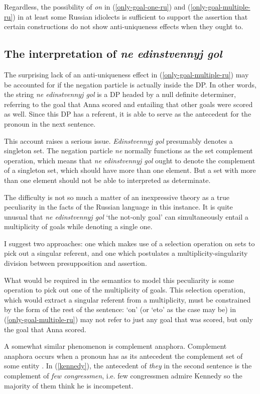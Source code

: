 \documentclass{article}
\begin{document}
Regardless, the possibility of \textit{on} in (\ref{only-goal-one-ru}) and (\ref{only-goal-multiple-ru}) in at least some Russian idiolects is sufficient to support the assertion that certain constructions do not show anti-uniqueness effects when they ought to.

\subsection{The interpretation of \textit{ne edinstvennyj gol}}
The surprising lack of an anti-uniqueness effect in (\ref{only-goal-multiple-ru}) may be accounted for if the negation particle is actually inside the DP. In other words, the string \textit{ne edinstvennyj gol} is a DP headed by a null definite determiner, referring to the goal that Anna scored and entailing that other goals were scored as well. Since this DP has a referent, it is able to serve as the antecedent for the pronoun in the next sentence.

This account raises a serious issue. \textit{Edinstvennyj gol} presumably denotes a singleton set. The negation particle \textit{ne} normally functions as the set complement operation, which means that \textit{ne edinstvennyj gol} ought to denote the complement of a singleton set, which should have more than one element. But a set with more than one element should not be able to interpreted as determinate.

The difficulty is not so much a matter of an inexpressive theory as a true peculiarity in the facts of the Russian language in this instance. It is quite unusual that \textit{ne edinstvennyj gol} `the not-only goal' can simultaneously entail a multiplicity of goals while denoting a single one.

I suggest two approaches: one which makes use of a selection operation on sets to pick out a singular referent, and one which postulates a multiplicity-singularity division between presupposition and assertion.

What would be required in the semantics to model this peculiarity is some operation to pick out one of the multiplicity of goals. This selection operation, which would extract a singular referent from a multiplicity, must be constrained by the form of the rest of the sentence: `on' (or `eto' as the case may be) in (\ref{only-goal-multiple-ru}) may not refer to just any goal that was scored, but only the goal that Anna scored.

A somewhat similar phenomenon is complement anaphora. Complement anaphora occurs when a pronoun has as its antecedent the complement set of some entity \citep{nouwen03, schwarz09}. In (\ref{kennedy}), the antecedent of \textit{they} in the second sentence is the complement of \textit{few congressmen}, i.e. few congressmen admire Kennedy so the majority of them think he is incompetent.
\end{document}
